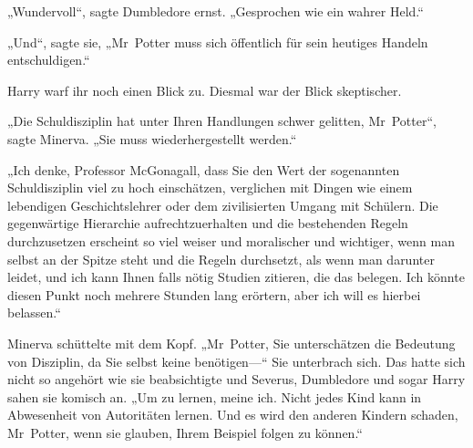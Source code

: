 „Wundervoll“, sagte Dumbledore ernst. „Gesprochen wie ein wahrer Held.“

„Und“, sagte sie, „Mr~Potter muss sich öffentlich für sein heutiges Handeln entschuldigen.“

Harry warf ihr noch einen Blick zu. Diesmal war der Blick skeptischer.

„Die Schuldisziplin hat unter Ihren Handlungen schwer gelitten, Mr~Potter“, sagte Minerva. „Sie muss wiederhergestellt werden.“

„Ich denke, Professor McGonagall, dass Sie den Wert der sogenannten Schuldisziplin viel zu hoch einschätzen, verglichen mit Dingen wie einem lebendigen Geschichtslehrer oder dem zivilisierten Umgang mit Schülern. Die gegenwärtige Hierarchie aufrechtzuerhalten und die bestehenden Regeln durchzusetzen erscheint so viel weiser und moralischer und wichtiger, wenn man selbst an der Spitze steht und die Regeln durchsetzt, als wenn man darunter leidet, und ich kann Ihnen falls nötig Studien zitieren, die das belegen. Ich könnte diesen Punkt noch mehrere Stunden lang erörtern, aber ich will es hierbei belassen.“

Minerva schüttelte mit dem Kopf. „Mr~Potter, Sie unterschätzen die Bedeutung von Disziplin, da Sie selbst keine benötigen—“ Sie unterbrach sich. Das hatte sich nicht so angehört wie sie beabsichtigte und Severus, Dumbledore und sogar Harry sahen sie komisch an. „Um zu lernen, meine ich. Nicht jedes Kind kann in Abwesenheit von Autoritäten lernen. Und es wird den anderen Kindern schaden, Mr~Potter, wenn sie glauben, Ihrem Beispiel folgen zu können.“

